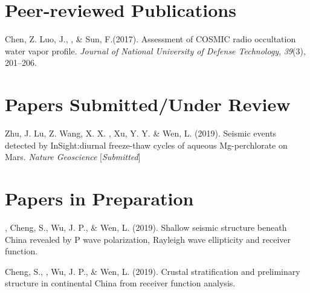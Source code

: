 \newcommand{\Revision}{\textit{under revision}}
\newcommand{\CS}{*} %
\newcommand{\CF}{\textsuperscript{\#}} %


\section*{Peer-reviewed Publications}

\begin{etaremune}
\item
    Chen, Z. Luo, J.,  \Xiao, \& Sun, F.(2017).
    Assessment of COSMIC radio occultation water vapor profile.
    \textit{Journal of National University of Defense Technology}, \textit{39}(3), 201--206.
\end{etaremune}

\section*{Papers Submitted/Under Review}
\begin{etaremune}
\item
    Zhu, J. Lu, Z. Wang, X. X. \Xiao, Xu, Y. Y. \& Wen, L. (2019).
    Seismic events detected by InSight:diurnal freeze-thaw cycles of aqueous Mg-perchlorate on Mars.
    \textit{Nature Geoscience} [\textit{Submitted}]
\end{etaremune}

\section*{Papers in Preparation}
\begin{etaremune}
\item
    \Xiao, Cheng, S., Wu, J. P., \& Wen, L. (2019).
    Shallow seismic structure beneath China revealed by P wave polarization, Rayleigh wave ellipticity and receiver function.
\item
    Cheng, S., \Xiao, Wu, J. P., \& Wen, L. (2019).
    Crustal stratification and preliminary structure in continental China from receiver function analysis. 
\end{etaremune}

